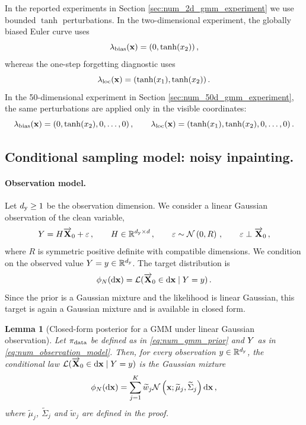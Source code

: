 \documentclass[11pt]{article}
\theoremstyle{plain}
\newtheorem{lemma}[theorem]{Lemma}
\theoremstyle{definition}
\theoremstyle{remark}
\begin{document}
In the reported experiments in Section \ref{sec:num_2d_gmm_experiment} we use bounded $\tanh$ perturbations.  In the
two-dimensional experiment, the globally biased Euler curve uses
$$
\lambda_{\rm bias}(\mathbf{x})=(0,\tanh(x_2)) \,,
$$
whereas the one-step forgetting diagnostic uses
$$
\lambda_{\rm loc}(\mathbf{x})=(\tanh(x_1),\tanh(x_2)) \, .
$$
In the 50-dimensional experiment in Section \ref{sec:num_50d_gmm_experiment}, the same perturbations are applied only in the visible coordinates:
$$
\lambda_{\rm bias}(\mathbf{x})=(0,\tanh(x_2),0,\ldots,0) \,,
\qquad
\lambda_{\rm loc}(\mathbf{x})=(\tanh(x_1),\tanh(x_2),0,\ldots,0) \,.
$$

\subsection{Conditional sampling model: noisy inpainting.}

\paragraph{Observation model.}
Let $d_\mathrm{y}\ge 1$ be the observation dimension. We consider a linear Gaussian
observation of the clean variable,
\begin{equation}
\label{eq:num_observation_model}
\Xobs = H \Xora_0 + \varepsilon \eqsp,
\qquad H\in\rset^{\dobs\times \xdim} \eqsp,
\qquad \varepsilon\sim\gaussiand{0}{R} \eqsp,
\qquad \varepsilon\perp \Xora_0 \eqsp,
\end{equation}
where $R$ is symmetric positive definite with compatible dimensions. We condition on the observed value $Y=y\in\mathbb{R}^{d_\mathrm{y}}$. The target
distribution is
$$
\filter{N}(\rmd \x) = \mathcal L(\Xora_0\in\rmd \x\mid \Xobs=\xobs) \eqsp.
$$
Since the prior is a Gaussian mixture and the likelihood is linear Gaussian,
this target is again a Gaussian mixture and is available in closed form.




\begin{lemma}[Closed-form posterior for a GMM under linear Gaussian observation]
\label{lem:num_gmm_linear_gaussian_posterior}
Let $\pi_{\rm data}$ be defined as in \eqref{eq:num_gmm_prior} and $Y$ as in \eqref{eq:num_observation_model}. Then, for every observation $y\in\mathbb{R}^{d_\mathrm{y}}$, the conditional law
$
\mathcal L(\overrightarrow{\mathbf{X}}_0\in\mathrm{d}\mathbf{x}\mid Y=y)
$
is the Gaussian mixture
\begin{equation}
\label{eq:num_exact_posterior_gmm}
\filter{N}(\rmd \x)
= \sum_{j=1}^{K} \widetilde w_j \gaussiand{\widetilde\mu_j}{\widetilde\Sigma_j}[\x] \rmd \x \eqsp,
\end{equation}
where  $\widetilde\mu_j$, $\widetilde\Sigma_j$ and $\widetilde w_j$ are defined in the proof.
\end{lemma}
\end{document}
